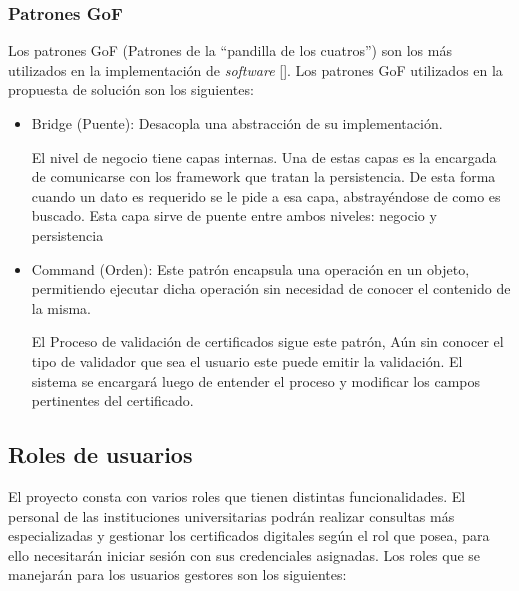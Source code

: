 \subsubsection{Patrones GoF}
Los patrones GoF (Patrones de la ``pandilla de los cuatros'') son los más utilizados en la implementación de \textit{software} [\cite{97}]. Los patrones GoF utilizados en la propuesta de solución son los siguientes:

\begin{itemize}
	\item Bridge (Puente): Desacopla una abstracción de su implementación.
	
	El nivel de negocio tiene capas internas. Una de estas capas es la encargada de comunicarse con los framework que tratan la persistencia. De esta forma cuando un dato es requerido se le pide a esa capa, abstrayéndose de como es buscado. Esta capa sirve de puente entre ambos niveles: negocio y persistencia
	
	\item Command (Orden): Este patrón encapsula una operación en un objeto, permitiendo ejecutar dicha operación sin necesidad de conocer el contenido de la misma.
	
	El Proceso de validación de certificados sigue este patrón, Aún sin conocer el tipo de validador que sea
	el usuario este puede emitir la validación. El sistema se encargará luego de entender el proceso y modificar los campos pertinentes del certificado.	
\end{itemize}

\subsection{Roles de usuarios}

El proyecto consta con varios roles que tienen distintas funcionalidades. El personal de las instituciones universitarias podrán realizar consultas más especializadas y gestionar los certificados digitales según el rol que posea, para ello necesitarán iniciar sesión con sus credenciales asignadas. Los roles que se manejarán para los usuarios gestores son los siguientes:

